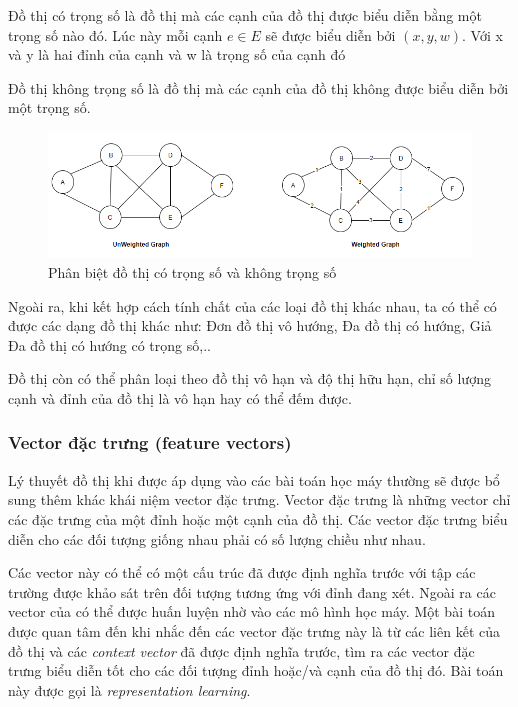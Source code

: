 Đồ thị có trọng số là đồ thị mà các cạnh của đồ thị được biểu diễn bằng một trọng số nào đó. Lúc này mỗi cạnh $e \in E$ sẽ được biểu diễn bởi $(x, y, w)$. Với x và y là hai đỉnh của cạnh và w là trọng số của cạnh đó

Đồ thị không trọng số là đồ thị mà các cạnh của đồ thị không được biểu diễn bởi một trọng số.

\begin{figure}[H]
    \begin{center}
        \includegraphics[scale=0.5]{images/graph-type-3}
        \caption{Phân biệt đồ thị có trọng số và không trọng số}
        \label{fig:graph-type-3}
    \end{center}
\end{figure}


Ngoài ra, khi kết hợp cách tính chất của các loại đồ thị khác nhau, ta có thể có được các dạng đồ thị khác như: Đơn đồ thị vô hướng, Đa đồ thị có hướng, Giả Đa đồ thị có hướng có trọng số,..

Đồ thị còn có thể phân loại theo đồ thị vô hạn và độ thị hữu hạn, chỉ số lượng cạnh và đỉnh của đồ thị là vô hạn hay có thể đếm được.

\subsubsection{Vector đặc trưng (feature vectors)}

Lý thuyết đồ thị khi được áp dụng vào các bài toán học máy thường sẽ được bổ sung thêm khác khái niệm vector đặc trưng. Vector đặc trưng là những vector chỉ các đặc trưng của một đỉnh hoặc một cạnh của đồ thị. Các vector đặc trưng biểu diễn cho các đối tượng giống nhau phải có số lượng chiều như nhau.

Các vector này có thể có một cấu trúc đã được định nghĩa trước với tập các trường được khảo sát trên đối tượng tương ứng với đỉnh đang xét. Ngoài ra các vector của có thể được huấn luyện nhờ vào các mô hình học máy. Một bài toán được quan tâm đến khi nhắc đến các vector đặc trưng này là từ các liên kết của đồ thị và các \textit{context vector} đã được định nghĩa trước, tìm ra các vector đặc trưng biểu diễn tốt cho các đối tượng đỉnh hoặc/và cạnh của đồ thị đó. Bài toán này được gọi là \textit{representation learning}.

